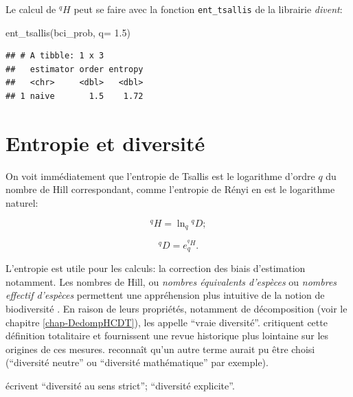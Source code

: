 \documentclass[
  11pt,
  american,
  a4paper,
  extrafontsizes,onecolumn,openright
  ]{memoir}
\newenvironment{Shaded}{\begin{snugshade}}{\end{snugshade}}
\newcommand{\AttributeTok}[1]{\textcolor[rgb]{0.77,0.63,0.00}{#1}}
\newcommand{\FloatTok}[1]{\textcolor[rgb]{0.00,0.00,0.81}{#1}}
\newcommand{\FunctionTok}[1]{\textcolor[rgb]{0.00,0.00,0.00}{#1}}
\newcommand{\NormalTok}[1]{#1}
\begin{document}
Le calcul de \(^{q}\!H\) peut se faire avec la fonction \texttt{ent\_tsallis} de la librairie \emph{divent}:

\scriptsize

\begin{Shaded}
\begin{Highlighting}[]
\FunctionTok{ent\_tsallis}\NormalTok{(bci\_prob, }\AttributeTok{q=} \FloatTok{1.5}\NormalTok{)}
\end{Highlighting}
\end{Shaded}

\begin{verbatim}
## # A tibble: 1 x 3
##   estimator order entropy
##   <chr>     <dbl>   <dbl>
## 1 naive       1.5    1.72
\end{verbatim}

\normalsize

\hypertarget{entropie-et-diversituxe9}{%
\section{Entropie et diversité}\label{entropie-et-diversituxe9}}

On voit immédiatement que l'entropie de Tsallis est le logarithme d'ordre \(q\) du nombre de Hill correspondant, comme l'entropie de Rényi en est le logarithme naturel:

\begin{equation}
  \label{eq:HlnD}
  ^{q}\!H = \ln_q{^{q}\!D};
\end{equation}

\begin{equation}
  \label{eq:DexpH}
  ^{q}\!D = e_q^{^{q}\!H}.
\end{equation}

L'entropie est utile pour les calculs: la correction des biais d'estimation notamment.
Les nombres de Hill, ou \emph{nombres équivalents d'espèces} ou \emph{nombres effectif d'espèces} permettent une appréhension plus intuitive de la notion de biodiversité \autocite{Jost2006}.
En raison de leurs propriétés, notamment de décomposition (voir le chapitre \ref{chap-DedompHCDT}), \textcite{Jost2007} les appelle \enquote{vraie diversité}.
\textcite{Hoffmann2008} critiquent cette définition totalitaire et fournissent une revue historique plus lointaine sur les origines de ces mesures.
\textcite{Jost2009} reconnaît qu'un autre terme aurait pu être choisi (\enquote{diversité neutre} ou \enquote{diversité mathématique} par exemple).

\textcite{Dauby2012} écrivent \enquote{diversité au sens strict}; \textcite{Gregorius2010} \enquote{diversité explicite}.
\end{document}

